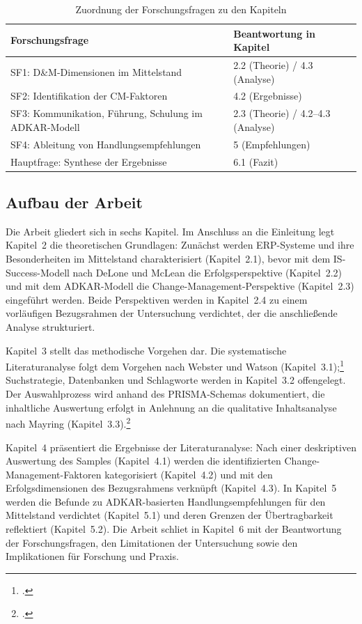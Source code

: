 \begin{table}[H]
\centering
\begin{tabularx}{\textwidth}{lX}
\toprule
\textbf{Forschungsfrage} & \textbf{Beantwortung in Kapitel} \\
\midrule
SF1: D\&M-Dimensionen im Mittelstand & 2.2 (Theorie) / 4.3 (Analyse) \\
SF2: Identifikation der CM-Faktoren & 4.2 (Ergebnisse) \\
SF3: Kommunikation, F\"uhrung, Schulung im ADKAR-Modell & 2.3 (Theorie) / 4.2--4.3 (Analyse) \\
SF4: Ableitung von Handlungsempfehlungen & 5 (Empfehlungen) \\
Hauptfrage: Synthese der Ergebnisse & 6.1 (Fazit) \\
\bottomrule
\end{tabularx}
\caption{Zuordnung der Forschungsfragen zu den Kapiteln}
\label{tab:ff-mapping}
\end{table}

\subsection{Aufbau der Arbeit}

Die Arbeit gliedert sich in sechs Kapitel. Im Anschluss an die Einleitung legt Kapitel~2 die theoretischen Grundlagen: Zun\"achst werden ERP-Systeme und ihre Besonderheiten im Mittelstand charakterisiert (Kapitel~2.1), bevor mit dem IS-Success-Modell nach DeLone und McLean die Erfolgsperspektive (Kapitel~2.2) und mit dem ADKAR-Modell die Change-Management-Perspektive (Kapitel~2.3) eingef\"uhrt werden. Beide Perspektiven werden in Kapitel~2.4 zu einem vorl\"aufigen Bezugsrahmen der Untersuchung verdichtet, der die anschlie\ss{}ende Analyse strukturiert.

Kapitel~3 stellt das methodische Vorgehen dar. Die systematische Literaturanalyse folgt dem Vorgehen nach Webster und Watson (Kapitel~3.1);\footcite[Vgl.][S.~xv--xviii]{webster2002} Suchstrategie, Datenbanken und Schlagworte werden in Kapitel~3.2 offengelegt. Der Auswahlprozess wird anhand des PRISMA-Schemas dokumentiert, die inhaltliche Auswertung erfolgt in Anlehnung an die qualitative Inhaltsanalyse nach Mayring (Kapitel~3.3).\footcite[Vgl.][S.~50~ff.]{mayring2015}

Kapitel~4 pr\"asentiert die Ergebnisse der Literaturanalyse: Nach einer deskriptiven Auswertung des Samples (Kapitel~4.1) werden die identifizierten Change-Management-Faktoren kategorisiert (Kapitel~4.2) und mit den Erfolgsdimensionen des Bezugsrahmens verkn\"upft (Kapitel~4.3). In Kapitel~5 werden die Befunde zu ADKAR-basierten Handlungsempfehlungen f\"ur den Mittelstand verdichtet (Kapitel~5.1) und deren Grenzen der \"Ubertragbarkeit reflektiert (Kapitel~5.2). Die Arbeit schlie\sst{}t in Kapitel~6 mit der Beantwortung der Forschungsfragen, den Limitationen der Untersuchung sowie den Implikationen f\"ur Forschung und Praxis.

